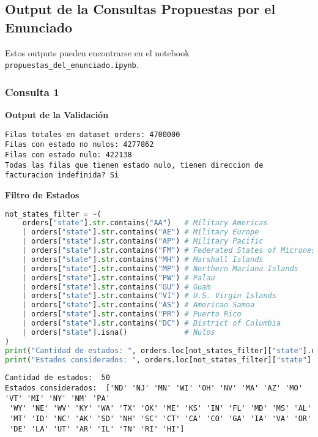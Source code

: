 \label{anexo}
\subsection{Output de la Consultas Propuestas por el Enunciado}
Estos outputs pueden encontrarse en el notebook \texttt{propuestas\_del\_enunciado.ipynb}. 
\subsubsection{Consulta 1}
\textbf{Output de la Validación}

\label{anexo:output_validacion_consulta1}
\begin{lstlisting}[style=console]
Filas totales en dataset orders: 4700000
Filas con estado no nulos: 4277862
Filas con estado nulo: 422138
Todas las filas que tienen estado nulo, tienen direccion de facturacion indefinida? Si
\end{lstlisting}

\textbf{Filtro de Estados}

\label{anexo:output_filtro_estados}
\begin{lstlisting}[language=Python]
not_states_filter = ~(
    orders["state"].str.contains("AA")   # Military Americas
    | orders["state"].str.contains("AE") # Military Europe
    | orders["state"].str.contains("AP") # Military Pacific
    | orders["state"].str.contains("FM") # Federated States of Micronesia
    | orders["state"].str.contains("MH") # Marshall Islands
    | orders["state"].str.contains("MP") # Northern Mariana Islands
    | orders["state"].str.contains("PW") # Palau
    | orders["state"].str.contains("GU") # Guam
    | orders["state"].str.contains("VI") # U.S. Virgin Islands
    | orders["state"].str.contains("AS") # American Samoa
    | orders["state"].str.contains("PR") # Puerto Rico
    | orders["state"].str.contains("DC") # District of Columbia
    | orders["state"].isna()             # Nulos
)
print("Cantidad de estados: ", orders.loc[not_states_filter]["state"].unique().size)
print("Estados considerados: ", orders.loc[not_states_filter]["state"].unique())
\end{lstlisting}
\begin{lstlisting}[style=console, aboveskip=0pt]
Cantidad de estados:  50
Estados considerados:  ['ND' 'NJ' 'MN' 'WI' 'OH' 'NV' 'MA' 'AZ' 'MO' 'VT' 'MI' 'NY' 'NM' 'PA'
 'WY' 'NE' 'WV' 'KY' 'WA' 'TX' 'OK' 'ME' 'KS' 'IN' 'FL' 'MD' 'MS' 'AL'
 'MT' 'ID' 'NC' 'AK' 'SD' 'NH' 'SC' 'CT' 'CA' 'CO' 'GA' 'IA' 'VA' 'OR'
 'DE' 'LA' 'UT' 'AR' 'IL' 'TN' 'RI' 'HI']
\end{lstlisting}

